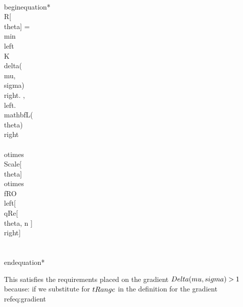 \\begin{equation*}
\\R[\\theta]   =  \\min\\left\\{K \\delta(\\mu,\\sigma) \\right. ,  \\left. \\mathbf{L}(\\theta) \\right\\} \\otimes \\Scale[\\theta] \\otimes \\fRO \\left[   \\qRe[ \\theta, n ] \\right]   \\\\
\\end{equation*}

This satisfies the requirements placed on the gradient $\\Delta(\\mu,\\sigma)>1$ because: if we substitute for $\\tRange$ in the definition for the gradient \\ref{eq:gradient}

